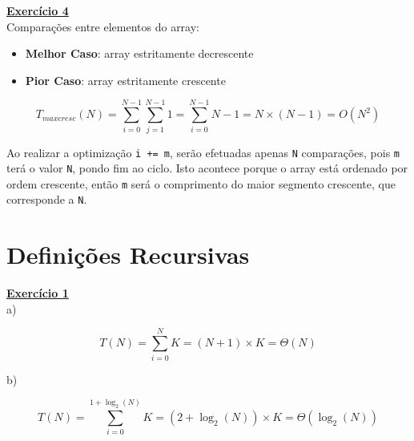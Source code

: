 \documentclass[a4paper,11pt]{article}
\begin{document}
	
	\noindent \underline{\textbf{Exercício 4}}\\
	
	\noindent Comparações entre elementos do array:
	
	\begin{itemize}
		\item \textbf{Melhor Caso}: array estritamente decrescente
		\item \textbf{Pior Caso}: array estritamente crescente
	\end{itemize}
	\[
		T_{maxcresc}(N) = \sum_{i=0}^{N-1} \sum_{j=1}^{N-1} 1 = \sum_{i=0}^{N-1} N - 1 = N \times (N-1) = O(N^2)
	\]
	
	\noindent Ao realizar a optimização \texttt{i += m}, serão efetuadas apenas \texttt{N} comparações, pois \texttt{m} terá o valor \texttt{N}, pondo fim ao ciclo. Isto acontece porque o array está ordenado por ordem crescente, então \texttt{m} será o comprimento do maior segmento crescente, que corresponde a \texttt{N}.
	
	
	\section{Definições Recursivas}
	
	\noindent \underline{\textbf{Exercício 1}}\\
	
	\noindent a)
	
	\begin{figure}[h]
		\centering
	\end{figure}
	\[
		T(N) = \sum_{i=0}^{N} K = (N + 1) \times K = \Theta(N)
	\]
	
	\noindent b)
	
	\begin{figure}[h]
		\centering
	\end{figure}
	\[
		T(N) = \sum_{i=0}^{1 + \log_2(N)} K = (2 + \log_2(N)) \times K = \Theta(\log_2(N))
	\]
	
\end{document}
